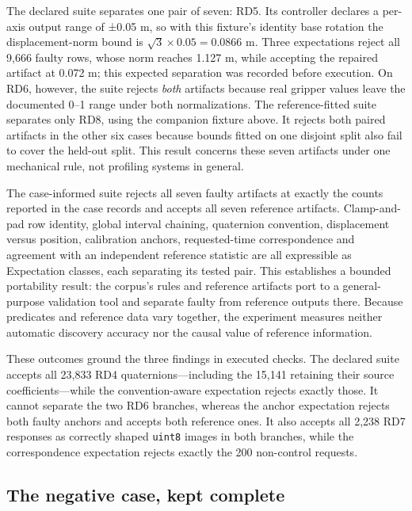 \documentclass[conference]{IEEEtran}
\begin{document}
The declared suite separates one pair of seven: RD5. Its controller declares a per-axis output range of ±0.05 m, so with this fixture's identity base rotation the displacement-norm bound is \(\sqrt{3}\times 0.05 = 0.0866\) m. Three expectations reject all 9,666 faulty rows, whose norm reaches 1.127 m, while accepting the repaired artifact at 0.072 m; this expected separation was recorded before execution. On RD6, however, the suite rejects \textit{both} artifacts because real gripper values leave the documented 0--1 range under both normalizations. The reference-fitted suite separates only RD8, using the companion fixture above. It rejects both paired artifacts in the other six cases because bounds fitted on one disjoint split also fail to cover the held-out split. This result concerns these seven artifacts under one mechanical rule, not profiling systems in general.\par

The case-informed suite rejects all seven faulty artifacts at exactly the counts reported in the case records and accepts all seven reference artifacts. Clamp-and-pad row identity, global interval chaining, quaternion convention, displacement versus position, calibration anchors, requested-time correspondence and agreement with an independent reference statistic are all expressible as Expectation classes, each separating its tested pair. This establishes a bounded portability result: the corpus's rules and reference artifacts port to a general-purpose validation tool and separate faulty from reference outputs there. Because predicates and reference data vary together, the experiment measures neither automatic discovery accuracy nor the causal value of reference information.\par

These outcomes ground the three findings in executed checks. The declared suite accepts all 23,833 RD4 quaternions---including the 15,141 retaining their source coefficients---while the convention-aware expectation rejects exactly those. It cannot separate the two RD6 branches, whereas the anchor expectation rejects both faulty anchors and accepts both reference ones. It also accepts all 2,238 RD7 responses as correctly shaped \texttt{uint8} images in both branches, while the correspondence expectation rejects exactly the 200 non-control requests.\par

\subsection{The negative case, kept complete}
\end{document}
